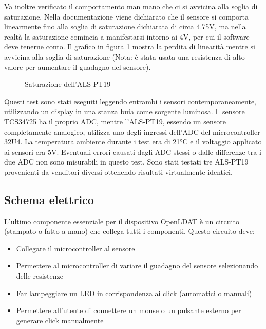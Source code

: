 Va inoltre verificato il comportamento man mano che ci si avvicina alla soglia di saturazione. Nella documentazione viene dichiarato che il sensore si comporta linearmente fino alla soglia di saturazione dichiarata di circa 4.75V\cite{als_pt19_datasheet}, ma nella realtà la saturazione comincia a manifestarsi intorno ai 4V, per cui il software deve tenerne conto. Il grafico in figura \ref{fig:pt19_linearity4} mostra la perdita di linearità mentre si avvicina alla soglia di saturazione (Nota: è stata usata una resistenza di alto valore per aumentare il guadagno del sensore).

\begin{figure}[h!]
	\centering
	\caption{Saturazione dell'ALS-PT19}
	\label{fig:pt19_linearity4}
\end{figure}

Questi test sono stati eseguiti leggendo entrambi i sensori contemporaneamente, utilizzando un display in una stanza buia come sorgente luminosa. Il sensore TCS34725 ha il proprio ADC, mentre l'ALS-PT19, essendo un sensore completamente analogico, utilizza uno degli ingressi dell'ADC del microcontroller 32U4. La temperatura ambiente durante i test era di 21°C e il voltaggio applicato ai sensori era 5V. Eventuali errori causati dagli ADC stessi o dalle differenze tra i due ADC non sono misurabili in questo test. Sono stati testati tre ALS-PT19 provenienti da venditori diversi ottenendo risultati virtualmente identici.

\subsection{Schema elettrico}
L'ultimo componente essenziale per il dispositivo OpenLDAT è un circuito (stampato o fatto a mano) che collega tutti i componenti. Questo circuito deve:
\begin{itemize}
	\item Collegare il microcontroller al sensore
	\item Permettere al microcontroller di variare il guadagno del sensore selezionando delle resistenze
	\item Far lampeggiare un LED in corrispondenza ai click (automatici o manuali)
	\item Permettere all'utente di connettere un mouse o un pulsante esterno per generare click manualmente
\end{itemize}

